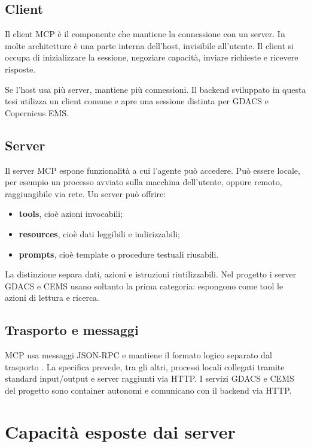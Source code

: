\subsection{Client}

Il client MCP è il componente che mantiene la connessione con un server. In molte architetture è una parte interna dell'host, invisibile all'utente. Il client si occupa di inizializzare la sessione, negoziare capacità, inviare richieste e ricevere risposte.

Se l'host usa più server, mantiene più connessioni. Il backend sviluppato in
questa tesi utilizza un client comune e apre una sessione distinta per GDACS e
Copernicus EMS.

\subsection{Server}

Il server MCP espone funzionalità a cui l'agente può accedere. Può essere locale, per esempio un processo avviato sulla macchina dell'utente, oppure remoto, raggiungibile via rete. Un server può offrire:
\begin{itemize}
    \item \textbf{tools}, cioè azioni invocabili;
    \item \textbf{resources}, cioè dati leggibili e indirizzabili;
    \item \textbf{prompts}, cioè template o procedure testuali riusabili.
\end{itemize}

La distinzione separa dati, azioni e istruzioni riutilizzabili. Nel progetto i
server GDACS e CEMS usano soltanto la prima categoria: espongono come tool le
azioni di lettura e ricerca.

\subsection{Trasporto e messaggi}

MCP usa messaggi JSON-RPC e mantiene il formato logico separato dal trasporto
\cite{mcpSpec}. La specifica prevede, tra gli altri, processi locali collegati
tramite standard input/output e server raggiunti via HTTP. I servizi GDACS e CEMS
del progetto sono container autonomi e comunicano con il backend via HTTP.

\section{Capacità esposte dai server}

